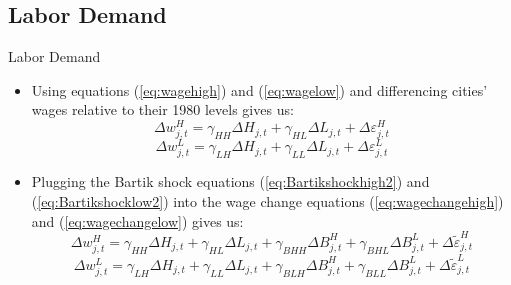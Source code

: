 \documentclass[aspectratio=169]{beamer}
\begin{document}
\subsection{Labor Demand}


\begin{frame}{Labor Demand}

\begin{itemize}
    \item<1-> Using equations (\ref{eq:wagehigh}) and (\ref{eq:wagelow}) and differencing cities’ wages relative to their 1980 levels gives us:
    \begin{equation}
        \Delta w_{j,t}^{H} = \gamma_{HH} \Delta H_{j,t} + \gamma_{HL} \Delta L_{j,t} + \Delta \varepsilon_{j,t}^{H}
        \label{eq:wagechangehigh}
    \end{equation}
    \begin{equation}
        \Delta w_{j,t}^{L} = \gamma_{LH} \Delta H_{j,t} + \gamma_{LL} \Delta L_{j,t} + \Delta \varepsilon_{j,t}^{L}
        \label{eq:wagechangelow}
    \end{equation}
    \item<2-> Plugging the Bartik shock equations (\ref{eq:Bartikshockhigh2}) and (\ref{eq:Bartikshocklow2}) into the wage change equations (\ref{eq:wagechangehigh}) and (\ref{eq:wagechangelow}) gives us:
    \begin{equation*}
        \Delta w_{j,t}^{H} = \gamma_{HH} \Delta H_{j,t} + \gamma_{HL} \Delta L_{j,t} + \gamma_{BHH} \Delta B_{j,t}^{H} + \gamma_{BHL} \Delta B_{j,t}^{L}+ \Delta \tilde{\varepsilon}_{j,t}^{H}
    \end{equation*}
    \begin{equation*}
        \Delta w_{j,t}^{L} = \gamma_{LH} \Delta H_{j,t} + \gamma_{LL} \Delta L_{j,t} + \gamma_{BLH} \Delta B_{j,t}^{H} + \gamma_{BLL} \Delta B_{j,t}^{L}+ \Delta \tilde{\varepsilon}_{j,t}^{L}
    \end{equation*}
\end{itemize}

\end{frame}

\end{document}
